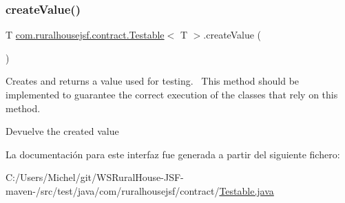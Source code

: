 \subsubsection{\texorpdfstring{createValue()}{createValue()}}
{\footnotesize\ttfamily T \mbox{\hyperlink{interfacecom_1_1ruralhousejsf_1_1contract_1_1_testable}{com.\+ruralhousejsf.\+contract.\+Testable}}$<$ T $>$.create\+Value (\begin{DoxyParamCaption}{ }\end{DoxyParamCaption})}

Creates and returns a value used for testing.~\newline
 This method should be implemented to guarantee the correct execution of the classes that rely on this method.

\begin{DoxyReturn}{Devuelve}
the created value 
\end{DoxyReturn}


La documentación para este interfaz fue generada a partir del siguiente fichero\+:\begin{DoxyCompactItemize}
\item 
C\+:/\+Users/\+Michel/git/\+W\+S\+Rural\+House-\/\+J\+S\+F-\/maven-\//src/test/java/com/ruralhousejsf/contract/\mbox{\hyperlink{_testable_8java}{Testable.\+java}}\end{DoxyCompactItemize}
